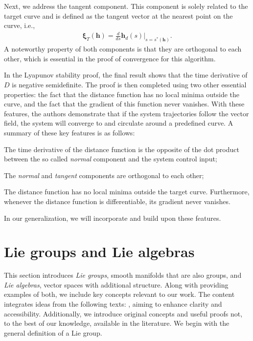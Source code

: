 Next, we address the tangent component. This component is solely related to the target curve and is defined as the tangent vector at the nearest point on the curve, i.e.,
\begin{align}
    \boldsymbol{\xi}_{T}(\mathbf{h}) = \frac{d}{ds}\mathbf{h}_d(s)|_{s=s^*(\mathbf{h})}.
\end{align}
A noteworthy property of both components is that they are orthogonal to each other, which is essential in the proof of convergence for this algorithm.

In the Lyapunov stability proof, the final result shows that the time derivative of $D$ is negative semidefinite. The proof is then completed using two other essential properties: the fact that the distance function has no local minima outside the curve, and the fact that the gradient of this function never vanishes. With these features, the authors demonstrate that if the system trajectories follow the vector field, the system will converge to and circulate around a predefined curve. A summary of these key features is as follows:
\begin{feature}
    \item The time derivative of the distance function is the opposite of the dot product between the so called \emph{normal} component and the system control input; \label{feat:adriano-time-derivative-lyapunov-normal-comp}
    \item The \emph{normal} and \emph{tangent} components are orthogonal to each other; \label{feat:adriano-orthogonality}
    \item The distance function has no local minima outside the target curve. Furthermore, whenever the distance function is differentiable, its gradient never vanishes. \label{feat:adriano-no-local-minima}
\end{feature}
In our generalization, we will incorporate and build upon these features.

\section{Lie groups and Lie algebras}\label{sec:background-lie-theory}
This section introduces \emph{Lie groups}, smooth manifolds that are also groups, and \emph{Lie algebras}, vector spaces with additional structure. Along with providing examples of both, we include key concepts relevant to our work. The content integrates ideas from the following texts: \citet{Lee2012,Gallier2020,Hall2015,Duistermaat2012}, aiming to enhance clarity and accessibility. Additionally, we introduce original concepts and useful proofs not, to the best of our knowledge, available in the literature. We begin with the general definition of a Lie group.
